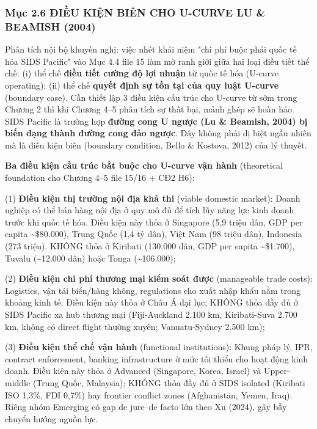 \documentclass[12pt,a4paper]{article}
\begin{document}
\hypertarget{mux1ee5c-26-ux111iux1ec1u-kiux1ec7n-biuxean-cho-u-curve-lu--beamish-2004}{%
\subsubsection{Mục 2.6 ĐIỀU KIỆN BIÊN CHO U-CURVE LU \& BEAMISH
(2004)}\label{mux1ee5c-26-ux111iux1ec1u-kiux1ec7n-biuxean-cho-u-curve-lu--beamish-2004}}

Phân tích nội bộ khuyến nghị: việc nhét khái niệm "chi phí buộc phải
quốc tế hóa SIDS Pacific" vào Mục 4.4 file 15 làm mờ ranh giới giữa hai
loại điều tiết thể chế: (i) thể chế \textbf{điều tiết cường độ lợi
nhuận} từ quốc tế hóa (U-curve operating); (ii) thể chế \textbf{quyết
định sự tồn tại của quy luật U-curve} (boundary case). Cần thiết lập 3
điều kiện cấu trúc cho U-curve từ sớm trong Chương 2 thì khi Chương 4--5
phân tích sự thất bại, mảnh ghép sẽ hoàn hảo. SIDS Pacific là trường hợp
\textbf{đường cong U ngược (Lu \& Beamish, 2004) bị biến dạng thành
đường cong đảo ngược}. Đây không phải dị biệt ngẫu nhiên mà là điều kiện
biên (boundary condition, Bello \& Kostova, 2012) của lý thuyết.

\textbf{Ba điều kiện cấu trúc bắt buộc cho U-curve vận hành}
(theoretical foundation cho Chương 4--5 file 15/16 + CĐ2 H6):

(1) \textbf{Điều kiện thị trường nội địa khả thi} (viable domestic
market): Doanh nghiệp có thể bán hàng nội địa ở quy mô đủ để tích lũy
năng lực kinh doanh trước khi quốc tế hóa. Điều kiện này thỏa ở
Singapore (5,9 triệu dân, GDP per capita \textasciitilde\$80.000), Trung
Quốc (1,4 tỷ dân), Việt Nam (98 triệu dân), Indonesia (273 triệu). KHÔNG
thỏa ở Kiribati (130.000 dân, GDP per capita \textasciitilde\$1.700),
Tuvalu (\textasciitilde12.000 dân) hoặc Tonga (\textasciitilde106.000);

(2) \textbf{Điều kiện chi phí thương mại kiểm soát được} (manageable
trade costs): Logistics, vận tải biển/hàng không, regulations cho xuất
nhập khẩu nằm trong khoảng kinh tế. Điều kiện này thỏa ở Châu Á đại lục;
KHÔNG thỏa đầy đủ ở SIDS Pacific xa hub thương mại (Fiji-Auckland 2.100
km, Kiribati-Suva 2.700 km, không có direct flight thường xuyên;
Vanuatu-Sydney 2.500 km);

(3) \textbf{Điều kiện thể chế vận hành} (functional institutions): Khung
pháp lý, IPR, contract enforcement, banking infrastructure ở mức tối
thiểu cho hoạt động kinh doanh. Điều kiện này thỏa ở Advanced
(Singapore, Korea, Israel) và Upper-middle (Trung Quốc, Malaysia); KHÔNG
thỏa đầy đủ ở SIDS isolated (Kiribati ISO 1,3\%, FDI 0,7\%) hay frontier
conflict zones (Afghanistan, Yemen, Iraq). Riêng nhóm Emerging có gap de
jure--de facto lớn theo Xu (2024), gây bẫy chuyển hướng nguồn lực.
\end{document}
